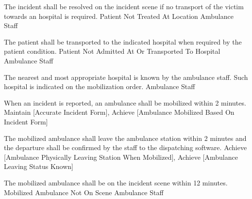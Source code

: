   \startkaosspec
  	 {The incident shall be resolved on the incident scene if no transport of the victim towards an hospital is required.}
  	 {Patient Not Treated At Location}
  	 {Ambulance Staff}
  \stopkaosspec

  \startkaosspec
  	 {The patient shall be transported to the indicated hospital when required by the patient condition.}
  	 {Patient Not Admitted At Or Transported To Hospital}
  	 {Ambulance Staff}
  \stopkaosspec

  \startkaosspec
  	 {The nearest and most appropriate hospital is known by the ambulance staff. Such hospital is indicated on the mobilization order.}
  	 {Ambulance Staff}
  \stopkaosspec
  
  
    {}

  \startkaosspec
  	 {When an incident is reported, an ambulance shall be mobilized within 2 minutes.}
  	 {Maintain [Accurate Incident Form], Achieve [Ambulance Mobilized Based On Incident Form]}
  \stopkaosspec

  \startkaosspec
  	 {The mobilized ambulance shall leave the ambulance station within 2 minutes and the departure shall be confirmed by the staff to the dispatching software.}
  	 {Achieve [Ambulance Physically Leaving Station When Mobilized], Achieve [Ambulance Leaving Status Known]}
  \stopkaosspec

  \startkaosspec
  	 {The mobilized ambulance shall be on the incident scene within 12 minutes.}
  	 {Mobilized Ambulance Not On Scene}
  	 {Ambulance Staff}
  \stopkaosspec
  
